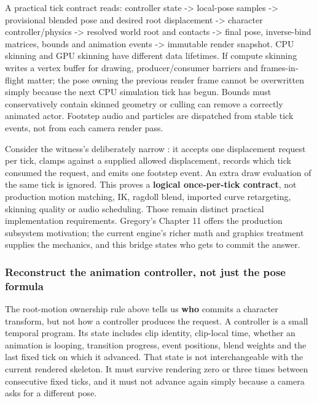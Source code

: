 A practical tick contract reads: controller state  -\textgreater{} local-pose samples -\textgreater{} provisional blended pose and desired root displacement -\textgreater{} character controller/physics -\textgreater{} resolved world root and contacts -\textgreater{} final pose, inverse-bind matrices, bounds and animation events -\textgreater{} immutable render snapshot. CPU skinning and GPU skinning have different data lifetimes. If compute skinning writes a vertex buffer for drawing, producer/consumer barriers and frames-in-flight matter; the pose owning the previous render frame cannot be overwritten simply because the next CPU simulation tick has begun. Bounds must conservatively contain skinned geometry or culling can remove a correctly animated actor. Footstep audio and particles are dispatched from stable tick events, not from each camera render pass.

Consider the witness's deliberately narrow : it accepts one displacement request per tick, clamps against a supplied allowed displacement, records which tick consumed the request, and emits one footstep event. An extra draw evaluation of the same tick is ignored. This proves a \textbf{logical once-per-tick contract}, not production motion matching, IK, ragdoll blend, imported curve retargeting, skinning quality or audio scheduling. Those remain distinct practical implementation requirements. Gregory's Chapter 11 offers the production subsystem motivation; the current engine's richer math and graphics treatment supplies the mechanics, and this bridge states who gets to commit the answer.

\subsubsection{Reconstruct the animation controller, not just the pose formula}\label{06-engine-ii-ch040-reconstruct-the-animation-controller-not-just-the-pose-formula}

\hypertarget{06-engine-ii-ch040-reconstruct-the-animation-controller-not-just-the-pose-formula}{}

The root-motion ownership rule above tells us \textbf{who} commits a character transform, but not how a controller produces the request. A controller is a small temporal program. Its state includes clip identity, clip-local time, whether an animation is looping, transition progress, event positions, blend weights and the last fixed tick on which it advanced. That state is not interchangeable with the current rendered skeleton. It must survive rendering zero or three times between consecutive fixed ticks, and it must not advance again simply because a camera asks for a different pose.

